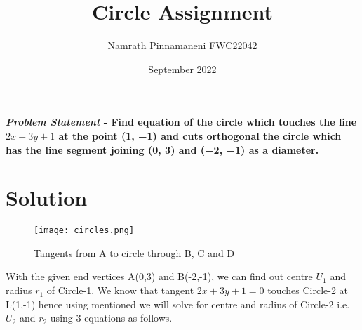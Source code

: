 \documentclass[journal,10pt,twocolumn]{article}
\title{\textbf{Circle Assignment}}
\author{Namrath Pinnamaneni \hspace{9cm} FWC22042}
\date{September 2022}
\begin{document}
\maketitle
\paragraph{\textit{Problem Statement} - Find equation of the circle which touches the line \(2x + 3y + 1\) at the point (1, −1) and cuts orthogonal the circle which has the line segment joining (0, 3) and (−2, −1) as a diameter.}

\section*{\large Solution}

\begin{figure}[H]
\centering
\texttt{[image: circles.png]}
\caption{Tangents from A to circle through B, C and D}
\label{fig:triangle}
\end{figure}

With the given end vertices A(0,3) and B(-2,-1), we can find out centre \(U_1\) and radius \(r_1\) of Circle-1. We know that tangent \(2x+3y+1=0\) touches Circle-2 at L(1,-1) hence using mentioned we will solve for centre and radius of Circle-2 i.e.   \(U_2\) and \(r_2\) using 3 equations as follows. \vspace{4mm}
\end{document}
